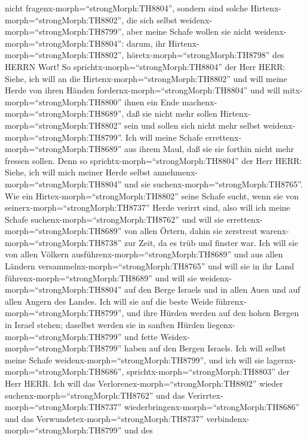 nicht fragenx-morph=``strongMorph:TH8804'', sondern sind solche
Hirtenx-morph=``strongMorph:TH8802'', die sich selbst
weidenx-morph=``strongMorph:TH8799'', aber meine Schafe wollen sie nicht
weidenx-morph=``strongMorph:TH8804'':  darum, ihr
Hirtenx-morph=``strongMorph:TH8802'',
höretx-morph=``strongMorph:TH8798'' des HERRN Wort!  So
sprichtx-morph=``strongMorph:TH8804'' der Herr HERR: Siehe, ich will an
die Hirtenx-morph=``strongMorph:TH8802'' und will meine Herde von ihren
Händen fordernx-morph=``strongMorph:TH8804'' und will
mitx-morph=``strongMorph:TH8800'' ihnen ein Ende
machenx-morph=``strongMorph:TH8689'', daß sie nicht mehr sollen
Hirtenx-morph=``strongMorph:TH8802'' sein und sollen sich nicht mehr
selbst weidenx-morph=``strongMorph:TH8799''. Ich will meine Schafe
errettenx-morph=``strongMorph:TH8689'' aus ihrem Maul, daß sie sie
forthin nicht mehr fressen sollen.  Denn so
sprichtx-morph=``strongMorph:TH8804'' der Herr HERR: Siehe, ich will
mich meiner Herde selbst annehmenx-morph=``strongMorph:TH8804'' und sie
suchenx-morph=``strongMorph:TH8765''.  Wie ein
Hirtex-morph=``strongMorph:TH8802'' seine Schafe sucht, wenn sie von
seinerx-morph=``strongMorph:TH8737'' Herde verirrt sind, also will ich
meine Schafe suchenx-morph=``strongMorph:TH8762'' und will sie
errettenx-morph=``strongMorph:TH8689'' von allen Örtern, dahin sie
zerstreut warenx-morph=``strongMorph:TH8738'' zur Zeit, da es trüb und
finster war.  Ich will sie von allen Völkern
ausführenx-morph=``strongMorph:TH8689'' und aus allen Ländern
versammelnx-morph=``strongMorph:TH8765'' und will sie in ihr Land
führenx-morph=``strongMorph:TH8689'' und will sie
weidenx-morph=``strongMorph:TH8804'' auf den Berge Israels und in allen
Auen und auf allen Angern des Landes.  Ich will sie auf die
beste Weide führenx-morph=``strongMorph:TH8799'', und ihre Hürden werden
auf den hohen Bergen in Israel stehen; daselbst werden sie in sanften
Hürden liegenx-morph=``strongMorph:TH8799'' und fette
Weidex-morph=``strongMorph:TH8799'' haben auf den Bergen Israels.
 Ich will selbst meine Schafe
weidenx-morph=``strongMorph:TH8799'', und ich will sie
lagernx-morph=``strongMorph:TH8686'',
sprichtx-morph=``strongMorph:TH8803'' der Herr HERR.  Ich
will das Verlorenex-morph=``strongMorph:TH8802'' wieder
suchenx-morph=``strongMorph:TH8762'' und das
Verirrtex-morph=``strongMorph:TH8737''
wiederbringenx-morph=``strongMorph:TH8686'' und das
Verwundetex-morph=``strongMorph:TH8737''
verbindenx-morph=``strongMorph:TH8799'' und des
